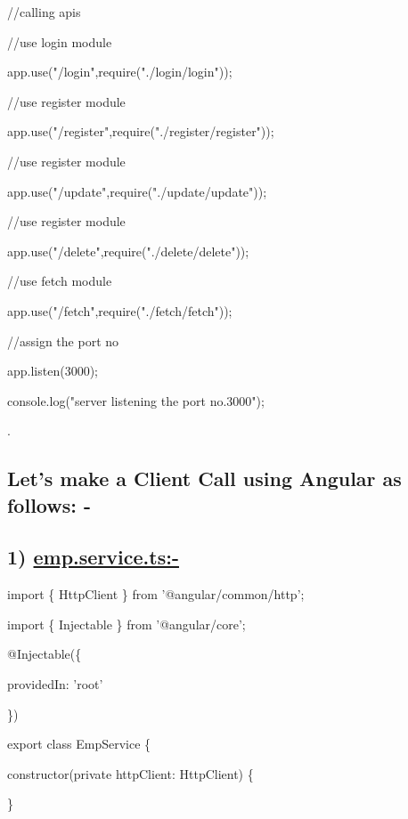 \documentclass[11pt,twoside]{article}
\begin{document}
//calling apis

//use login module

app.use("/login",require("./login/login"));

//use register module 

app.use("/register",require("./register/register"));

//use register module 

app.use("/update",require("./update/update"));

//use register module

app.use("/delete",require("./delete/delete"));

//use fetch module

app.use("/fetch",require("./fetch/fetch"));

\vspace{2\baselineskip}
//assign the port no

app.listen(3000);

console.log("server listening the port no.3000");

\vspace{18\baselineskip}
.

\subsection*{Let's make a Client Call using Angular as follows: -} 

\vspace{1\baselineskip}
\subsection*{1) \uline{emp.service.ts:-}}

\vspace{1\baselineskip}
import \{ HttpClient \} from '@angular/common/http';

import \{ Injectable \} from '@angular/core';

\vspace{1\baselineskip}
@Injectable(\{ 
  
\hspace*{5}providedIn: 'root'

\})

export class EmpService \{

\vspace{1\baselineskip}
\hspace*{5}constructor(private httpClient: HttpClient) \{ 

\hspace*{5}\}
\end{document}

